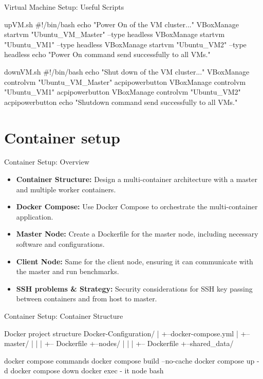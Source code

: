\documentclass[10pt, english, xcolor={dvipsnames, table}]{beamer}
\begin{document}
\begin{frame}[fragile]{Virtual Machine Setup: Useful Scripts}
    \begin{codice}[style=bashstyle]{upVM.sh}
        #!/bin/bash
        echo "Power On of the VM cluster..."
        VBoxManage startvm "Ubuntu_VM_Master" --type headless
        VBoxManage startvm "Ubuntu_VM1" --type headless
        VBoxManage startvm "Ubuntu_VM2" --type headless
        echo "Power On command send successfully to all VMs."
    \end{codice}
    \begin{codice}[style=bashstyle]{downVM.sh}
        #!/bin/bash
        echo "Shut down of the VM cluster..."
        VBoxManage controlvm "Ubuntu_VM_Master" acpipowerbutton
        VBoxManage controlvm "Ubuntu_VM1" acpipowerbutton
        VBoxManage controlvm "Ubuntu_VM2" acpipowerbutton
        echo "Shutdown command send successfully to all VMs."
    \end{codice}
\end{frame}

\section{Container setup}
\begin{frame}{Container Setup: Overview}
    \begin{itemize}
        \item \textbf{\color{UniOrange}Container Structure:} Design a multi-container architecture with a master and multiple worker containers.
        \item \textbf{\color{UniOrange}Docker Compose:} Use Docker Compose to orchestrate the multi-container application.
        \item \textbf{\color{UniOrange}Master Node:} Create a Dockerfile for the master node, including necessary software and configurations.
        \item \textbf{\color{UniOrange}Client Node:} Same for the client node, ensuring it can communicate with the master and run benchmarks.
        \item \textbf{\color{UniOrange}SSH problems \& Strategy:} Security considerations for SSH key passing between containers and from host to master.
    \end{itemize}
\end{frame}

\begin{frame}[fragile]{Container Setup: Container Structure}
    \begin{codice}[]{Docker project structure}
        Docker-Configuration/
        |
        +--docker-compose.yml
        |
        +--master/
        |  |
        |  +-- Dockerfile
        +--nodes/
        |  |
        |  +-- Dockerfile
        +--shared_data/
    \end{codice}
    \begin{codice}[style=bashstyle]{docker compose commands}
        docker compose build --no-cache
        docker compose up -d
        docker compose down
        docker exec - it node bash
    \end{codice}
\end{frame}
\end{document}
